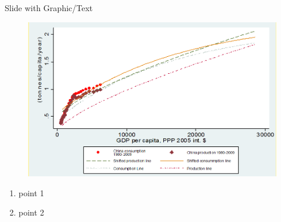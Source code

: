 \documentclass[newPxFont]{beamer}
\begin{document}
\begin{frame}[c]{Slide with Graphic/Text}
\begin{figure}
	\centering
	\includegraphics[width=0.65\linewidth]{Importer.png}
\end{figure}
\begin{enumerate}  
	\item{point 1}
	\item{point 2}  
\end{enumerate}  
\end{frame}
\end{document}
